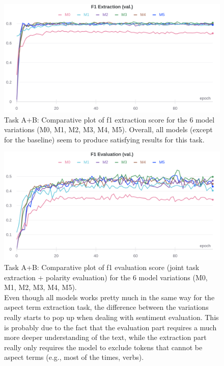 \documentclass[11pt,a4paper]{article}
\begin{document}
	\begin{figure}[H]
		\centering
		\includegraphics[width=1\columnwidth]{ab_comparative_f1_extr.png}
		\caption{Task A+B: Comparative plot of f1 extraction score for the 6 model variations (M0, M1, M2, M3, M4, M5). Overall, all models (except for the baseline) seem to produce satisfying results for this task.}
		\label{fig:comparative_f1_extr}
	\end{figure}
	
	\begin{figure}[H]
		\centering
		\includegraphics[width=1\columnwidth]{ab_comparative_f1_eval.png}
		\caption{Task A+B: Comparative plot of f1 evaluation score (joint task extraction + polarity evaluation) for the 6 model variations (M0, M1, M2, M3, M4, M5). \\ Even though all models works pretty much in the same way for the aspect term extraction task, the difference between the variations really starts to pop up when dealing with sentiment evaluation. This is probably due to the fact that the evaluation part requires a much more deeper understanding of the text, while the extraction part really only requires the model to exclude tokens that cannot be aspect terms (e.g., most of the times, verbs).}
		\label{fig:comparative_f1_eval}
	\end{figure}
	
\end{document}
